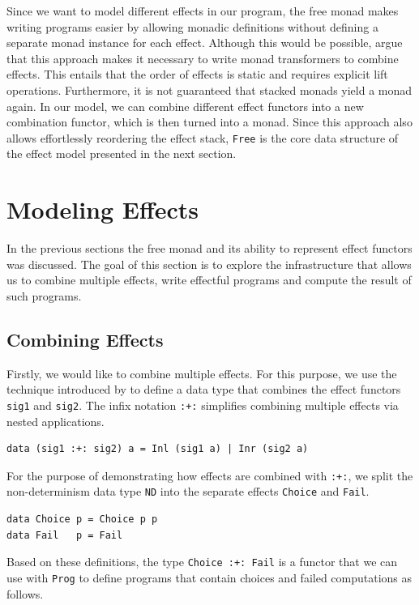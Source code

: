 \documentclass[a4paper, 11pt, fleqn, twoside]{scrreprt}
\newcommand{\hinl}[1]{\texttt{#1}}
\newcommand{\cinl}[1]{\texttt{#1}}
\begin{document}
Since we want to model different effects in our program, the free monad makes writing programs easier by allowing monadic definitions without defining a separate monad instance for each effect.
Although this would be possible, \citet{kammar2013handlers} argue that this approach makes it necessary to write monad transformers to combine effects.
This entails that the order of effects is static and requires explicit lift operations.
Furthermore, it is not guaranteed that stacked monads yield a monad again.
In our model, we can combine different effect functors into a new combination functor, which is then turned into a monad.
Since this approach also allows effortlessly reordering the effect stack, \hinl{Free} is the core data structure of the effect model presented in the next section.

\section{Modeling Effects}
In the previous sections the free monad and its ability to represent effect functors was discussed.
The goal of this section is to explore the infrastructure that allows us to combine multiple effects, write effectful programs and compute the result of such programs.

\subsection{Combining Effects}
Firstly, we would like to combine multiple effects.
For this purpose, we use the technique introduced by \citet{swierstra2008} to define a data type that combines the effect functors \hinl{sig1} and \hinl{sig2}.
The infix notation \hinl{:+:} simplifies combining multiple effects via nested applications.

\begin{verbatim}
data (sig1 :+: sig2) a = Inl (sig1 a) | Inr (sig2 a)
\end{verbatim}

For the purpose of demonstrating how effects are combined with \cinl{:+:}, we split the non-determinism data type \hinl{ND} into the separate effects \hinl{Choice} and \hinl{Fail}.

\begin{verbatim}
data Choice p = Choice p p
data Fail   p = Fail
\end{verbatim}

Based on these definitions, the type \hinl{Choice :+: Fail} is a functor that we can use with \hinl{Prog} to define programs that contain choices and failed computations as follows.
\end{document}
